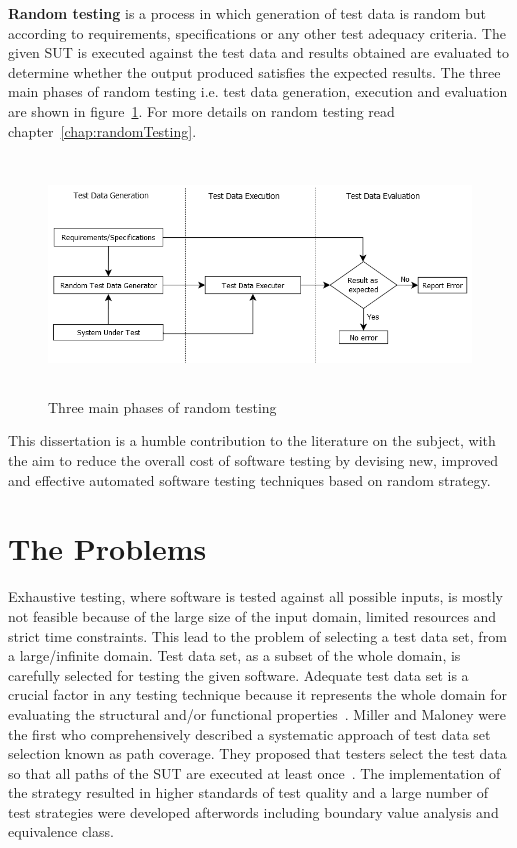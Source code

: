 {\textbf {Random testing}} is a process in which generation of test data is random but according to requirements, specifications or any other test adequacy criteria. The given SUT is executed against the test data and results obtained are evaluated to determine whether the output produced satisfies the expected results. The three main phases of random testing i.e. test data generation, execution and evaluation are shown in figure~\ref{fig:SoftwareTesting1}. For more details on random testing read chapter~\ref{chap:randomTesting}.
\\
\begin{figure}[h]
	\centering
		\includegraphics[width=14cm, height=6.3cm ]{chapter1/SoftwareTesting1.png}
		\caption{Three main phases of random testing}
	\label{fig:SoftwareTesting1}
\end{figure}

This dissertation is a humble contribution to the literature on the subject, with the aim to reduce the overall cost of software testing by devising new, improved and effective automated software testing techniques based on random strategy.

\section{The Problems}
Exhaustive testing, where software is tested against all possible inputs, is mostly not feasible because of the large size of the input domain, limited resources and strict time constraints. This lead to the problem of selecting a test data set, from a large/infinite domain. Test data set, as a subset of the whole domain, is carefully selected for testing the given software. Adequate test data set is a crucial factor in any testing technique because it represents the whole domain for evaluating the structural and/or functional properties~\cite{howden1986, mccabe1983}. Miller and Maloney were the first who comprehensively described a systematic approach of test data set selection known as path coverage. They proposed that testers select the test data so that all paths of the SUT are executed at least once~\cite{Miller1963}. The implementation of the strategy resulted in higher standards of test quality and a large number of test strategies were developed afterwords including boundary value analysis and equivalence class.

